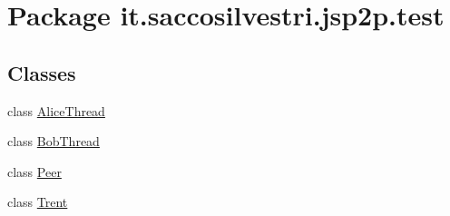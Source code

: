 \hypertarget{namespaceit_1_1saccosilvestri_1_1jsp2p_1_1test}{
\section{\-Package it.saccosilvestri.jsp2p.test}
\label{namespaceit_1_1saccosilvestri_1_1jsp2p_1_1test}
}
\subsection*{\-Classes}
\begin{DoxyCompactItemize}
\item 
class \hyperlink{classit_1_1saccosilvestri_1_1jsp2p_1_1test_1_1_alice_thread}{\-Alice\-Thread}
\item 
class \hyperlink{classit_1_1saccosilvestri_1_1jsp2p_1_1test_1_1_bob_thread}{\-Bob\-Thread}
\item 
class \hyperlink{classit_1_1saccosilvestri_1_1jsp2p_1_1test_1_1_peer}{\-Peer}
\item 
class \hyperlink{classit_1_1saccosilvestri_1_1jsp2p_1_1test_1_1_trent}{\-Trent}
\end{DoxyCompactItemize}
